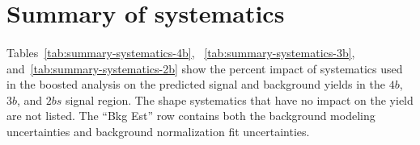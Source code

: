 \section{Summary of systematics}
\label{sec:boosted-systematics-numbers}
\paragraph{}
Tables~\ref{tab:summary-systematics-4b}, ~\ref{tab:summary-systematics-3b}, and~\ref{tab:summary-systematics-2b} show the percent impact of systematics used in the boosted analysis on the predicted signal and background yields in the $4b$, $3b$, and $2bs$ signal region.
The shape systematics that have no impact on the yield are not listed.
The ``Bkg Est'' row contains both the background modeling uncertainties and background normalization fit uncertainties.

